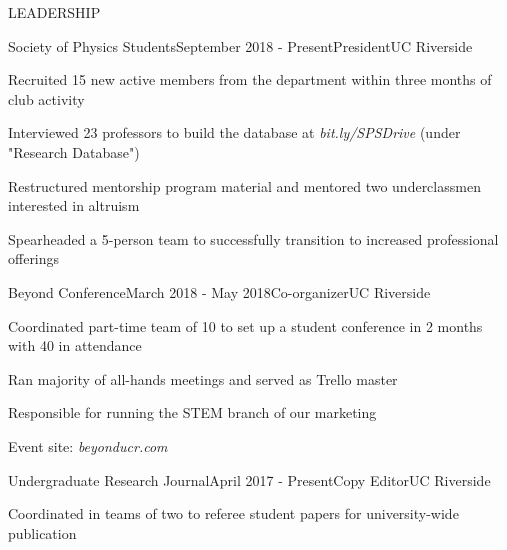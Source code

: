 \documentclass{resume} %
\begin{document}
\begin{rSection}{LEADERSHIP}

\begin{rSubsection}{Society of Physics Students}{September 2018 - Present}{President}{UC Riverside}
\item Recruited 15 new active members from the department within three months of club activity
\item Interviewed 23 professors to build the database at {\em bit.ly/SPSDrive} (under "Research Database")
\item Restructured mentorship program material and mentored two underclassmen interested in altruism
\item Spearheaded a 5-person team to successfully transition to increased professional offerings
\end{rSubsection}


\begin{rSubsection}{Beyond Conference}{March 2018 - May 2018}{Co-organizer}{UC Riverside}
\item Coordinated part-time team of 10 to set up a student conference in 2 months with 40 in attendance
\item Ran majority of all-hands meetings and served as Trello master
\item Responsible for running the STEM branch of our marketing
\item Event site: {\em beyonducr.com}
\end{rSubsection}


\begin{rSubsection}{Undergraduate Research Journal}{April 2017 - Present}{Copy Editor}{UC Riverside}
\item Coordinated in teams of two to referee student papers for university-wide publication
\end{rSubsection}

\end{rSection}

\end{document}
